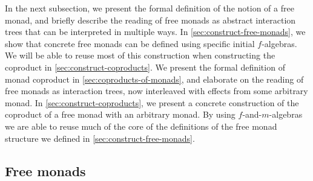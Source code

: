 \documentclass{jfp1}
\begin{document}
In the next subsection, we present the formal definition of the notion
of a free monad, and briefly describe the reading of free monads as
abstract interaction trees that can be interpreted in multiple
ways. In \autoref{sec:construct-free-monads}, we show that concrete
free monads can be defined using specific initial $f$-algebras. We
will be able to reuse most of this construction when constructing the
coproduct in \autoref{sec:construct-coproducts}. We present the formal
definition of monad coproduct in \autoref{sec:coproducts-of-monads},
and elaborate on the reading of free monads as interaction trees, now
interleaved with effects from some arbitrary monad. In
\autoref{sec:construct-coproducts}, we present a concrete construction
of the coproduct of a free monad with an arbitrary monad. By using
$f$-and-$m$-algebras we are able to reuse much of the core of the
definitions of the free monad structure we defined in
\autoref{sec:construct-free-monads}.






\subsection{Free monads}
\label{sec:free-monads}
\end{document}
